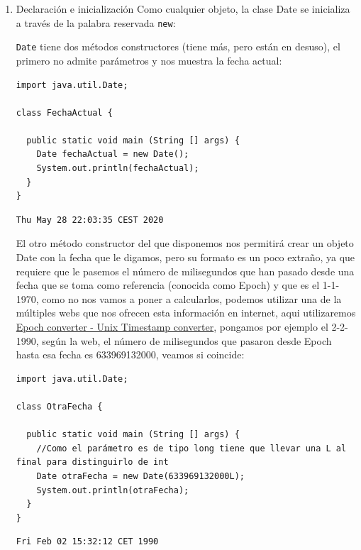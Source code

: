 \documentclass[11pt]{article}
\begin{document}
\begin{enumerate}
\item Declaración e inicialización
\label{sec:org8c4fd47}
Como cualquier objeto, la clase Date se inicializa a través de la palabra reservada \texttt{new}:

\texttt{Date} tiene dos métodos constructores (tiene más, pero están en desuso), el primero no admite parámetros y nos muestra la fecha actual:

\begin{verbatim}
import java.util.Date;

class FechaActual {

  public static void main (String [] args) {
    Date fechaActual = new Date();
    System.out.println(fechaActual);
  }
}
\end{verbatim}

\begin{verbatim}
Thu May 28 22:03:35 CEST 2020
\end{verbatim}


El otro método constructor del que disponemos nos permitirá crear un objeto Date con la fecha que le digamos, pero su formato es un poco extraño, ya que requiere que le pasemos el número de milisegundos que han pasado desde una fecha que se toma como referencia (conocida como Epoch) y que es el 1-1-1970, como no nos vamos a poner a calcularlos, podemos utilizar una de la múltiples webs que nos ofrecen esta información en internet, aqui utilizaremos \href{https://www.epochconverter.com}{Epoch converter - Unix Timestamp converter}, pongamos por ejemplo el 2-2-1990, según la web, el número de milisegundos que pasaron desde Epoch hasta esa fecha es 633969132000, veamos si coincide:

\begin{verbatim}
import java.util.Date;

class OtraFecha {

  public static void main (String [] args) {
    //Como el parámetro es de tipo long tiene que llevar una L al final para distinguirlo de int
    Date otraFecha = new Date(633969132000L);
    System.out.println(otraFecha);
  }
}
\end{verbatim}

\begin{verbatim}
Fri Feb 02 15:32:12 CET 1990
\end{verbatim}


\end{enumerate}
\end{document}
